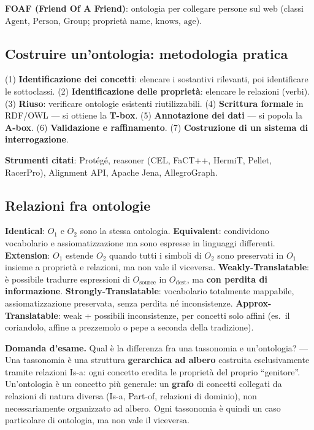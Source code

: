 \documentclass[11pt,a4paper]{report}
\newcommand{\domandaesame}[1]{\begin{esame}\textbf{Domanda d'esame.} #1\end{esame}}
\begin{document}
\textbf{FOAF (Friend Of A Friend)}: ontologia per collegare persone sul web (classi $\text{Agent}$, $\text{Person}$, $\text{Group}$; proprietà $\text{name}$, $\text{knows}$, $\text{age}$).

\subsection{Costruire un'ontologia: metodologia pratica}

(1) \textbf{Identificazione dei concetti}: elencare i sostantivi rilevanti, poi identificare le sottoclassi. (2) \textbf{Identificazione delle proprietà}: elencare le relazioni (verbi). (3) \textbf{Riuso}: verificare ontologie esistenti riutilizzabili. (4) \textbf{Scrittura formale} in RDF/OWL --- si ottiene la \textbf{T-box}. (5) \textbf{Annotazione dei dati} --- si popola la \textbf{A-box}. (6) \textbf{Validazione e raffinamento}. (7) \textbf{Costruzione di un sistema di interrogazione}.

\textbf{Strumenti citati}: Protégé, reasoner (CEL, FaCT++, HermiT, Pellet, RacerPro), Alignment API, Apache Jena, AllegroGraph.

\subsection{Relazioni fra ontologie}

\textbf{Identical}: $O_1$ e $O_2$ sono la stessa ontologia. \textbf{Equivalent}: condividono vocabolario e assiomatizzazione ma sono espresse in linguaggi differenti. \textbf{Extension}: $O_1$ estende $O_2$ quando tutti i simboli di $O_2$ sono preservati in $O_1$ insieme a proprietà e relazioni, ma non vale il viceversa. \textbf{Weakly-Translatable}: è possibile tradurre espressioni di $O_{\text{source}}$ in $O_{\text{dest}}$, ma \textbf{con perdita di informazione}. \textbf{Strongly-Translatable}: vocabolario totalmente mappabile, assiomatizzazione preservata, senza perdita né inconsistenze. \textbf{Approx-Translatable}: weak + possibili inconsistenze, per concetti solo affini (es.\ il coriandolo, affine a prezzemolo o pepe a seconda della tradizione).

\domandaesame{Qual è la differenza fra una tassonomia e un'ontologia? --- Una tassonomia è una struttura \textbf{gerarchica ad albero} costruita esclusivamente tramite relazioni Is-a: ogni concetto eredita le proprietà del proprio ``genitore''. Un'ontologia è un concetto più generale: un \textbf{grafo} di concetti collegati da relazioni di natura diversa (Is-a, Part-of, relazioni di dominio), non necessariamente organizzato ad albero. Ogni tassonomia è quindi un caso particolare di ontologia, ma non vale il viceversa.}
\end{document}
